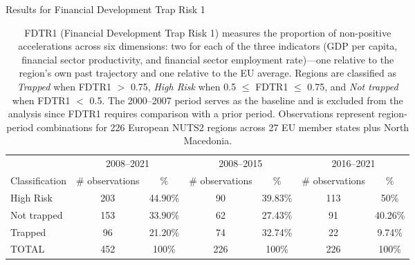 \documentclass[a4paper,11pt,oneside]{article}
\begin{document}
\begin{table}%
\centering
\caption{Results for Financial Development Trap Risk 1}
\vspace{-2mm}
\caption*{\footnotesize FDTR1 (Financial Development Trap Risk 1) measures the proportion of non-positive accelerations across six dimensions: two for each of the three indicators (GDP per capita, financial sector productivity, and financial sector employment rate)---one relative to the region's own past trajectory and one relative to the EU average. Regions are classified as \textit{Trapped} when FDTR1 $>$ 0.75, \textit{High Risk} when 0.5 $\leq$ FDTR1 $\leq$ 0.75, and \textit{Not trapped} when FDTR1 $<$ 0.5. The 2000--2007 period serves as the baseline and is excluded from the analysis since FDTR1 requires comparison with a prior period. Observations represent region-period combinations for 226 European NUTS2 regions across 27 EU member states plus North Macedonia.}
\label{tbl:results_fdtr_1}
\footnotesize
\begin{tabular}{lcccccc}
\toprule
               & \multicolumn{2}{c}{2008--2021} & \multicolumn{2}{c}{2008--2015}    & \multicolumn{2}{c}{2016--2021}    \\
\cmidrule(r){2-3}
\cmidrule(r){4-5}
\cmidrule(r){6-7}
Classification & \# observations    & \%         & \# observations & \%      & \# observations & \%      \\
\midrule
High Risk      & 203                       & 44.90\%    & 90                     & 39.83\% & 113                    & 50\%    \\
Not trapped    & 153                       & 33.90\%    & 62                     & 27.43\% & 91                     & 40.26\% \\
Trapped        & 96                        & 21.20\%    & 74                     & 32.74\% & 22                     & 9.74\%  \\
\midrule
TOTAL          & 452                       & 100\%      & 226                    & 100\%   & 226                    & 100\%  \\
\bottomrule
\end{tabular}
\end{table}



\pagebreak
\clearpage
\end{document}
